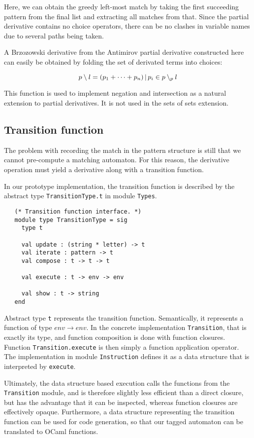 Here, we can obtain the greedy left-most match by taking the first succeeding
pattern from the final list and extracting all matches from that. Since the
partial derivative contains no choice operators, there can be no clashes in
variable names due to several paths being taken.

A Brzozowski derivative from the Antimirov partial derivative constructed here
can easily be obtained by folding the set of derivated terms into choices:

\[p \setminus l = (p_1 + \dots + p_n) \operatorname{|} p_i \in p \setminus_p l \]

This function is used to implement negation and intersection as a natural
extension to partial derivatives. It is not used in the sets of sets extension.


\subsection{Transition function}

The problem with recording the match in the pattern structure is still that we
cannot pre-compute a matching automaton. For this reason, the derivative
operation must yield a derivative along with a transition function.

In our prototype implementation, the transition function is described by the
abstract type \texttt{TransitionType.t} in module \texttt{Types}.

\begin{lstlisting}
   (* Transition function interface. *)
   module type TransitionType = sig
     type t

     val update : (string * letter) -> t
     val iterate : pattern -> t
     val compose : t -> t -> t

     val execute : t -> env -> env

     val show : t -> string
   end
\end{lstlisting}

Abstract type \texttt{t} represents the transition function. Semantically, it
represents a function of type $\mathit{env} \to \mathit{env}$. In the concrete
implementation \texttt{Transition}, that is exactly its type, and function
composition is done with function closures. Function \texttt{Transition.execute}
is then simply a function application operator. The implementation in module
\texttt{Instruction} defines it as a data structure that is interpreted by
\texttt{execute}.

Ultimately, the data structure based execution calls the functions from the
\texttt{Transition} module, and is therefore slightly less efficient than a
direct closure, but has the advantage that it can be inspected, whereas function
closures are effectively opaque. Furthermore, a data structure representing the
transition function can be used for code generation, so that our tagged
automaton can be translated to OCaml functions.

